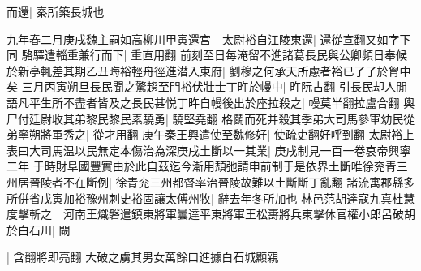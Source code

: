 而還|{
	秦所築長城也}


九年春二月庚戌魏主嗣如高柳川甲寅還宫　太尉裕自江陵東還|{
	還從宣翻又如字下同}
駱驛遣輜重兼行而下|{
	重直用翻}
前刻至日每淹留不進諸葛長民與公卿頻日奉候於新亭輒差其期乙丑晦裕輕舟徑進潜入東府|{
	劉穆之何承天所慮者裕已了了於胷中矣}
三月丙寅朔旦長民聞之驚趨至門裕伏壯士丁旿於幔中|{
	旿阮古翻}
引長民却人閒語凡平生所不盡者皆及之長民甚悦丁旿自幔後出於座拉殺之|{
	幔莫半翻拉盧合翻}
輿尸付廷尉收其弟黎民黎民素驍勇|{
	驍堅堯翻}
格鬬而死并殺其季弟大司馬參軍幼民從弟寧朔將軍秀之|{
	從才用翻}
庚午秦王興遣使至魏修好|{
	使疏吏翻好呼到翻}
太尉裕上表曰大司馬温以民無定本傷治為深庚戌土斷以一其業|{
	庚戌制見一百一卷哀帝興寧二年}
于時財阜國豐實由於此自茲迄今漸用頹弛請申前制于是依界土斷唯徐兖青三州居晉陵者不在斷例|{
	徐青兖三州都督率治晉陵故難以土斷斷丁亂翻}
諸流寓郡縣多所併省戊寅加裕豫州刺史裕固讓太傅州牧|{
	辭去年冬所加也}
林邑范胡達寇九真杜慧度擊斬之　河南王熾磐遣鎮東將軍曇達平東將軍王松夀將兵東擊休官權小郎呂破胡於白石川|{
	闕}


|{
	含翻將即亮翻}
大破之虜其男女萬餘口進據白石城顯親

